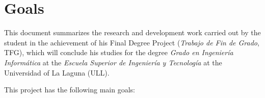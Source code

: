 %
%
%
%


\chapter{Goals} \label{chap:Goals}  
This document summarizes the research and development work carried out by the student in the achievement of his Final Degree Project (\textit{Trabajo de Fin de Grado}, TFG), which will conclude his studies for the degree \textit{Grado en Ingeniería Informática} at the \textit{Escuela Superior de Ingeniería y Tecnología} at the Universidad of La Laguna (ULL).

This project has the following main goals:


